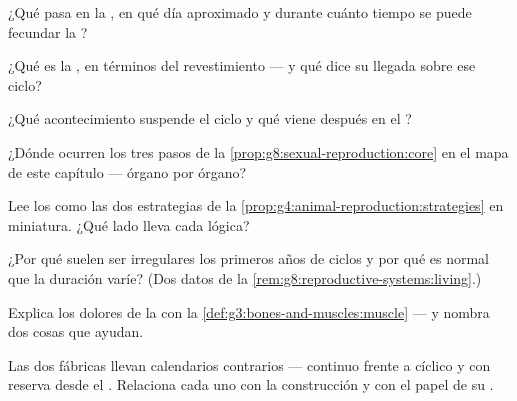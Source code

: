 \begin{exercise}[$\star$]\label{exo:g8:reproductive-systems:4}
¿Qué pasa en la , en qué día aproximado y durante cuánto
tiempo se puede fecundar la  ?
\end{exercise}

\begin{exercise}[$\star$]\label{exo:g8:reproductive-systems:5}
¿Qué es la , en términos del revestimiento --- y qué dice
su llegada sobre ese ciclo?
\end{exercise}

\begin{exercise}[$\star$]\label{exo:g8:reproductive-systems:6}
¿Qué acontecimiento suspende el ciclo y qué viene después en el ?
\end{exercise}

\begin{exercise}[$\star\star$]\label{exo:g8:reproductive-systems:7}
¿Dónde ocurren los tres pasos de la
\cref{prop:g8:sexual-reproduction:core} en el mapa de este capítulo ---
órgano por órgano?
\end{exercise}

\begin{exercise}[$\star\star$]\label{exo:g8:reproductive-systems:8}
Lee los  como las dos estrategias de la
\cref{prop:g4:animal-reproduction:strategies} en miniatura. ¿Qué lado
lleva cada lógica?
\end{exercise}

\begin{exercise}[$\star\star$]\label{exo:g8:reproductive-systems:9}
¿Por qué suelen ser irregulares los primeros años de ciclos y por qué
es normal que la duración varíe? (Dos datos de la
\cref{rem:g8:reproductive-systems:living}.)
\end{exercise}

\begin{exercise}[$\star\star$]\label{exo:g8:reproductive-systems:10}
Explica los dolores de la  con la
\cref{def:g3:bones-and-muscles:muscle} --- y nombra dos cosas que
ayudan.
\end{exercise}

\begin{exercise}[$\star\star$]\label{exo:g8:reproductive-systems:11}
Las dos fábricas llevan calendarios contrarios --- continuo frente a
cíclico y con reserva desde el . Relaciona cada uno con la
construcción y con el papel de su .
\end{exercise}

